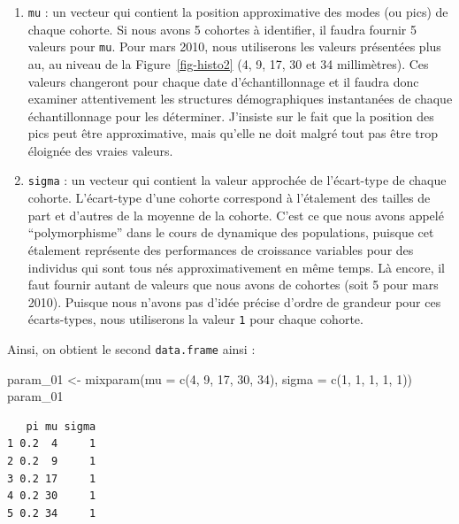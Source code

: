 \documentclass[
  french,
  a4paper,
  DIV=11,
  numbers=noendperiod,
  oneside]{scrreprt}
\newenvironment{Shaded}{}{}
\newcommand{\AttributeTok}[1]{\textcolor[rgb]{0.84,0.23,0.29}{#1}}
\newcommand{\DecValTok}[1]{\textcolor[rgb]{0.00,0.36,0.77}{#1}}
\newcommand{\FunctionTok}[1]{\textcolor[rgb]{0.44,0.26,0.76}{#1}}
\newcommand{\NormalTok}[1]{\textcolor[rgb]{0.14,0.16,0.18}{#1}}
\newcommand{\OtherTok}[1]{\textcolor[rgb]{0.44,0.26,0.76}{#1}}
\providecommand{\tightlist}{%
  \setlength{\itemsep}{0pt}\setlength{\parskip}{0pt}}
\begin{document}
\begin{tcolorbox}
\begin{enumerate}
\def\labelenumi{\arabic{enumi}.}
\tightlist
\item
  \texttt{mu} : un vecteur qui contient la position approximative des
  modes (ou pics) de chaque cohorte. Si nous avons 5 cohortes à
  identifier, il faudra fournir 5 valeurs pour \texttt{mu}. Pour mars
  2010, nous utiliserons les valeurs présentées plus au, au niveau de la
  Figure~\ref{fig-histo2} (4, 9, 17, 30 et 34 millimètres). Ces valeurs
  changeront pour chaque date d'échantillonnage et il faudra donc
  examiner attentivement les structures démographiques instantanées de
  chaque échantillonnage pour les déterminer. J'insiste sur le fait que
  la position des pics peut être approximative, mais qu'elle ne doit
  malgré tout pas être trop éloignée des vraies valeurs.
\item
  \texttt{sigma} : un vecteur qui contient la valeur approchée de
  l'écart-type de chaque cohorte. L'écart-type d'une cohorte correspond
  à l'étalement des tailles de part et d'autres de la moyenne de la
  cohorte. C'est ce que nous avons appelé ``polymorphisme'' dans le
  cours de dynamique des populations, puisque cet étalement représente
  des performances de croissance variables pour des individus qui sont
  tous nés approximativement en même temps. Là encore, il faut fournir
  autant de valeurs que nous avons de cohortes (soit 5 pour mars 2010).
  Puisque nous n'avons pas d'idée précise d'ordre de grandeur pour ces
  écarts-types, nous utiliserons la valeur \texttt{1} pour chaque
  cohorte.
\end{enumerate}

Ainsi, on obtient le second \texttt{data.frame} ainsi :

\begin{Shaded}
\begin{Highlighting}[]
\NormalTok{param\_01 }\OtherTok{\textless{}{-}} \FunctionTok{mixparam}\NormalTok{(}\AttributeTok{mu =} \FunctionTok{c}\NormalTok{(}\DecValTok{4}\NormalTok{, }\DecValTok{9}\NormalTok{, }\DecValTok{17}\NormalTok{, }\DecValTok{30}\NormalTok{, }\DecValTok{34}\NormalTok{),}
                     \AttributeTok{sigma =} \FunctionTok{c}\NormalTok{(}\DecValTok{1}\NormalTok{, }\DecValTok{1}\NormalTok{, }\DecValTok{1}\NormalTok{, }\DecValTok{1}\NormalTok{, }\DecValTok{1}\NormalTok{))}
\NormalTok{param\_01}
\end{Highlighting}
\end{Shaded}

\begin{verbatim}
   pi mu sigma
1 0.2  4     1
2 0.2  9     1
3 0.2 17     1
4 0.2 30     1
5 0.2 34     1
\end{verbatim}


\end{tcolorbox}
\end{document}
